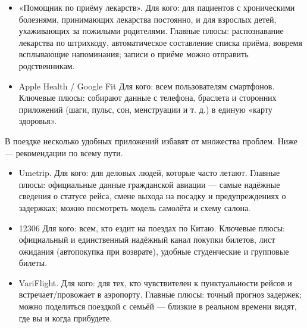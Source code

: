 
\begin{itemize}
  \item «Помощник по приёму лекарств». Для кого: для пациентов с хроническими болезнями, принимающих лекарства постоянно, и для взрослых детей, ухаживающих за пожилыми родителями. Главные плюсы: распознавание лекарства по штрихкоду, автоматическое составление списка приёма, вовремя всплывающие напоминания; записи о приёме можно отправить родственникам.
\end{itemize}


\begin{itemize}
  \item Apple Health / Google Fit Для кого: всем пользователям смартфонов. Ключевые плюсы: собирают данные с телефона, браслета и сторонних приложений (шаги, пульс, сон, менструации и т. д.) в единую «карту здоровья».
\end{itemize}


В поездке несколько удобных приложений избавят от множества проблем. Ниже — рекомендации по всему пути.


\begin{itemize}
  \item Umetrip. Для кого: для деловых людей, которые часто летают. Главные плюсы: официальные данные гражданской авиации — самые надёжные сведения о статусе рейса, смене выхода на посадку и предупреждениях о задержках; можно посмотреть модель самолёта и схему салона.
  \item 12306 Для кого: всем, кто ездит на поездах по Китаю. Ключевые плюсы: официальный и единственный надёжный канал покупки билетов, лист ожидания (автопокупка при возврате), удобные студенческие и групповые билеты.
  \item VariFlight. Для кого: для тех, кто чувствителен к пунктуальности рейсов и встречает/провожает в аэропорту. Главные плюсы: точный прогноз задержек; можно поделиться поездкой с семьёй — близкие в реальном времени видят, где вы и когда прибудете.
\end{itemize}


